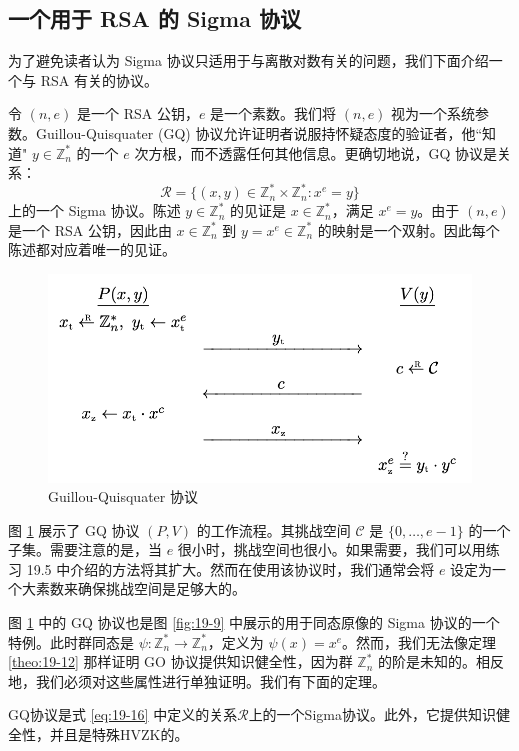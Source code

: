 \subsection{一个用于 RSA 的 Sigma 协议}\label{subsec:19-5-5}

为了避免读者认为 Sigma 协议只适用于与离散对数有关的问题，我们下面介绍一个与 RSA 有关的协议。

令 $(n,e)$ 是一个 RSA 公钥，$e$ 是一个素数。我们将 $(n,e)$ 视为一个系统参数。Guillou-Quisquater (GQ) 协议允许证明者说服持怀疑态度的验证者，他``知道" $y\in\mathbb{Z}_n^*$ 的一个 $e$ 次方根，而不透露任何其他信息。更确切地说，GQ 协议是关系：
\begin{equation}\label{eq:19-16}
\mathcal{R}=
\bigg\lbrace
(x,y)\in\mathbb{Z}_n^*\times\mathbb{Z}_n^*:x^e=y
\bigg\rbrace
\end{equation}
上的一个 Sigma 协议。陈述 $y\in\mathbb{Z}_n^*$ 的见证是 $x\in\mathbb{Z}_n^*$，满足 $x^e=y$。由于 $(n,e)$ 是一个 RSA 公钥，因此由 $x\in\mathbb{Z}_n^*$ 到 $y=x^e\in\mathbb{Z}_n^*$ 的映射是一个双射。因此每个陈述都对应着唯一的见证。

\begin{figure}
  \centering
  \includegraphics[width=0.6\linewidth]{figures/chapter19/fig10.png}
  \caption{Guillou-Quisquater 协议}
  \label{fig:19-10}
\end{figure}


图 \ref{fig:19-10} 展示了 GQ 协议 $(P,V)$ 的工作流程。其挑战空间 $\mathcal{C}$ 是 $\{0,\dots,e-1\}$ 的一个子集。需要注意的是，当 $e$ 很小时，挑战空间也很小。如果需要，我们可以用练习 19.5 中介绍的方法将其扩大。然而在使用该协议时，我们通常会将 $e$ 设定为一个大素数来确保挑战空间是足够大的。

图 \ref{fig:19-10} 中的 GQ 协议也是图 \ref{fig:19-9} 中展示的用于同态原像的 Sigma 协议的一个特例。此时群同态是 $\psi:\mathbb{Z}_n^*\to\mathbb{Z}_n^*$，定义为 $\psi(x)=x^e$。然而，我们无法像定理 \ref{theo:19-12} 那样证明 GO 协议提供知识健全性，因为群 $\mathbb{Z}_n^*$ 的阶是未知的。相反地，我们必须对这些属性进行单独证明。我们有下面的定理。

\begin{theorem}
GQ协议是式 \ref{eq:19-16} 中定义的关系$\mathcal R$上的一个Sigma协议。此外，它提供知识健全性，并且是特殊HVZK的。
\end{theorem}

